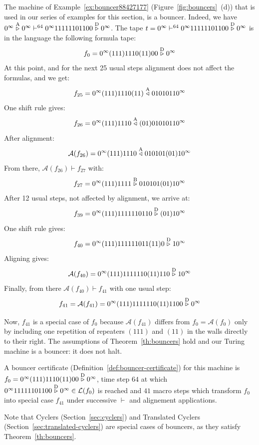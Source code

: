 \begin{example}\label{ex:bouncerTheory}
    The machine of Example~\ref{ex:bouncer88427177} (Figure~\ref{fig:bouncers}~(d)) that is used in our series of examples for this section, is a bouncer. Indeed, we have $0^\infty \stackrel{\text{A}}\triangleright 0^\infty \vdash^{64} 0^\infty 11111101100 \stackrel{\text{D}}\triangleright 0^\infty$. The tape $t=0^\infty \vdash^{64} 0^\infty 11111101100 \stackrel{\text{D}}\triangleright 0^\infty$ is in the language the following formula tape:
    $$f_0 = 0^\infty (111)1110(11)00\stackrel{\text{D}}\triangleright0^\infty$$
    At this point, and for the next 25 usual steps alignment does not affect the formulas, and we get: $$f_{25} = 0^\infty (111) 1110 (11) \stackrel{\text{A}}\triangleleft 01010110^\infty$$
    One shift rule gives:
    $$ f_{26} = 0^\infty (111) 1110  \stackrel{\text{A}}\triangleleft (01) 01010110^\infty$$
    After alignment:
    $$ \mathcal{A}(f_{26}) = 0^\infty (111) 1110  \stackrel{\text{A}}\triangleleft 010101(01)10^\infty$$
    From there, $\mathcal{A}(f_{26}) \vdash f_{27}$ with:
    $$ f_{27} = 0^\infty (111) 1111  \stackrel{\text{B}}\triangleright 010101(01)10^\infty$$
    After 12 usual steps, not affected by alignment, we arrive at:
    $$f_{39} = 0^\infty (111)1111110110\stackrel{\text{D}}\triangleright(01)10^\infty$$
    One shift rule gives:
    $$f_{40} = 0^\infty (111)111111011(11)0\stackrel{\text{D}}\triangleright10^\infty$$
    Aligning gives:
    $$\mathcal{A}(f_{40}) = 0^\infty (111)1111110(11)110\stackrel{\text{D}}\triangleright10^\infty$$
    Finally, from there $\mathcal{A}(f_{40}) \vdash f_{41}$ with one usual step:
    $$f_{41} =\mathcal{A}(f_{41}) = 0^\infty (111)1111110(11)1100\stackrel{\text{D}}\triangleright0^\infty$$

    Now, $f_{41}$ is a special case of $f_{0}$ because $\mathcal{A}(f_{41})$ differs from $f_0=\mathcal{A}(f_0)$ only by including one repetition of repeaters $(111)$ and $(11)$ in the walls directly to their right. The assumptions of Theorem~\ref{th:bouncers} hold and our Turing machine is a bouncer: it does not halt.

    A bouncer certificate (Definition~\ref{def:bouncer-certificate}) for this machine is $f_0 = 0^\infty (111)1110(11)00\stackrel{\text{D}}\triangleright0^\infty$, time step $64$ at which $0^\infty 11111101100 \stackrel{\text{D}}\triangleright 0^\infty \in \mathcal{L}(f_0)$ is reached and $41$ macro steps which transform $f_0$ into special case $f_{41}$ under successive $\vdash$ and alignement applications.
\end{example}

Note that Cyclers (Section~\ref{sec:cyclers}) and Translated Cyclers (Section~\ref{sec:translated-cyclers}) are special cases of bouncers, as they satisfy Theorem~\ref{th:bouncers}.


